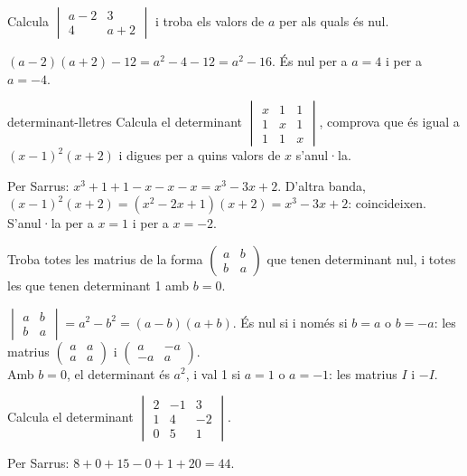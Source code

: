 \begin{apartats}

Calcula $\begin{vmatrix}a-2&3\\4&a+2\end{vmatrix}$ i troba els valors de $a$ per als quals és nul.

\begin{solucio}
$(a-2)(a+2)-12=a^2-4-12=a^2-16$. És nul per a $a=4$ i per a $a=-4$.
\end{solucio}

\begin{tria}{determinant-lletres}
Calcula el determinant $\begin{vmatrix}x&1&1\\1&x&1\\1&1&x\end{vmatrix}$, comprova que és igual a
$(x-1)^2(x+2)$ i digues per a quins valors de $x$ s'anul·la.

\begin{solucio}
Per Sarrus: $x^3+1+1-x-x-x=x^3-3x+2$. D'altra banda, $(x-1)^2(x+2)=(x^2-2x+1)(x+2)=x^3-3x+2$: coincideixen.
S'anul·la per a $x=1$ i per a $x=-2$.
\end{solucio}

Troba totes les matrius de la forma $\begin{pmatrix}a&b\\b&a\end{pmatrix}$ que tenen determinant nul, i
totes les que tenen determinant 1 amb $b=0$.

\begin{solucio}
$\begin{vmatrix}a&b\\b&a\end{vmatrix}=a^2-b^2=(a-b)(a+b)$. És nul si i només si $b=a$ o $b=-a$: les
matrius $\begin{pmatrix}a&a\\a&a\end{pmatrix}$ i $\begin{pmatrix}a&-a\\-a&a\end{pmatrix}$.\\
Amb $b=0$, el determinant és $a^2$, i val 1 si $a=1$ o $a=-1$: les matrius $I$ i $-I$.
\end{solucio}
\end{tria}

\begin{nomesllarg}
Calcula el determinant $\begin{vmatrix}2&-1&3\\1&4&-2\\0&5&1\end{vmatrix}$.

\begin{solucio}
Per Sarrus: $8+0+15-0+1+20=44$.
\end{solucio}
\end{nomesllarg}

\end{apartats}
